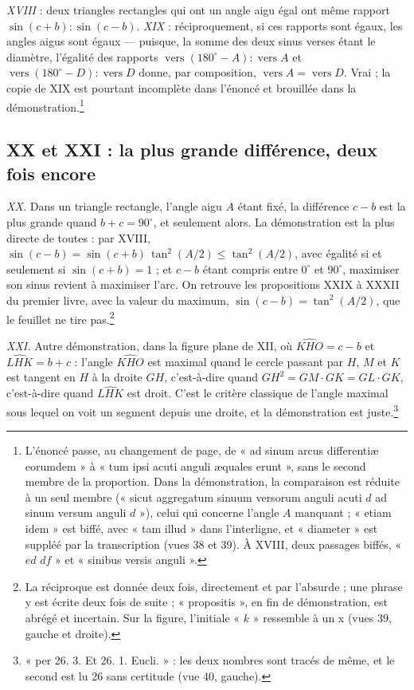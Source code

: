 \documentclass[11pt,a4paper]{article}
\begin{document}
\emph{XVIII} : deux triangles rectangles qui ont un angle aigu égal ont même
rapport $\sin(c+b) : \sin(c-b)$. \emph{XIX} : réciproquement, si ces rapports sont
égaux, les angles aigus sont égaux — puisque, la somme des deux sinus verses
étant le diamètre, l'égalité des rapports $\operatorname{vers}(180^\circ-A) :
\operatorname{vers}A$ et $\operatorname{vers}(180^\circ-D) : \operatorname{vers}D$
donne, par composition, $\operatorname{vers}A = \operatorname{vers}D$. Vrai ; la
copie de XIX est pourtant incomplète dans l'énoncé et brouillée dans la
démonstration.\footnote{L'énoncé passe, au changement de page, de « ad sinum
arcus differentiæ eorumdem » à « tum ipsi acuti anguli æquales erunt », sans le
second membre de la proportion. Dans la démonstration, la comparaison est réduite
à un seul membre (« sicut aggregatum sinuum versorum anguli acuti $d$ ad sinum
versum anguli $d$ »), celui qui concerne l'angle $A$ manquant ; « etiam idem » est
biffé, avec « tam illud » dans l'interligne, et « diameter » est suppléé par la
transcription (vues 38 et 39). À XVIII, deux passages biffés, « $ed$ $df$ » et
« sinibus versis anguli ».}

\subsection*{XX et XXI : la plus grande différence, deux fois encore}

\emph{XX.} Dans un triangle rectangle, l'angle aigu $A$ étant fixé, la différence
$c - b$ est la plus grande quand $b + c = 90^\circ$, et seulement alors. La
démonstration est la plus directe de toutes : par XVIII,
$\sin(c-b) = \sin(c+b)\,\tan^2(A/2) \le \tan^2(A/2)$, avec égalité si et
seulement si $\sin(c+b) = 1$ ; et $c - b$ étant compris entre $0^\circ$ et
$90^\circ$, maximiser son sinus revient à maximiser l'arc. On retrouve les
propositions XXIX à XXXII du premier livre, avec la valeur du maximum,
$\sin(c-b) = \tan^2(A/2)$, que le feuillet ne tire pas.\footnote{La réciproque est
donnée deux fois, directement et par l'absurde ; une phrase y est écrite deux fois
de suite ; « propositis », en fin de démonstration, est abrégé et incertain. Sur
la figure, l'initiale « $k$ » ressemble à un x (vues 39, gauche et droite).}

\emph{XXI.} Autre démonstration, dans la figure plane de XII, où
$\widehat{KHO} = c - b$ et $\widehat{LHK} = b + c$ : l'angle $\widehat{KHO}$ est
maximal quand le cercle passant par $H$, $M$ et $K$ est tangent en $H$ à la droite
$GH$, c'est-à-dire quand $GH^2 = GM\cdot GK = GL\cdot GK$, c'est-à-dire quand
$\widehat{LHK}$ est droit. C'est le critère classique de l'angle maximal sous
lequel on voit un segment depuis une droite, et la démonstration est
juste.\footnote{« per 26. 3. Et 26. 1. Eucli. » : les deux nombres sont tracés de
même, et le second est lu 26 sans certitude (vue 40, gauche).}
\end{document}
